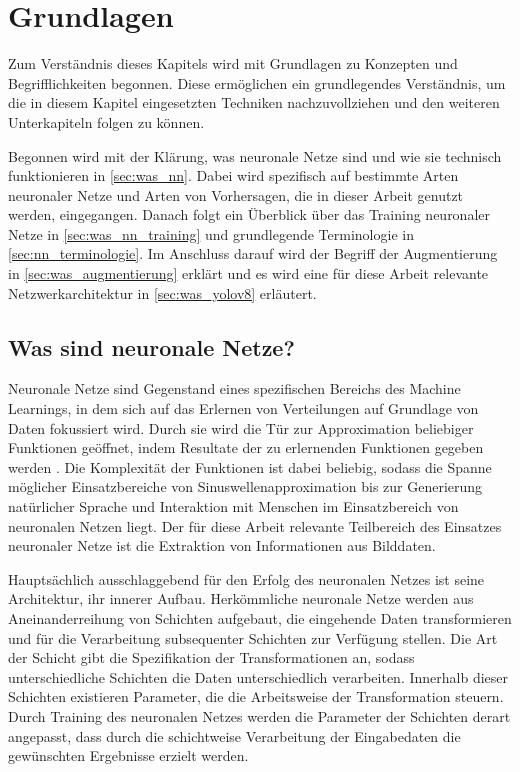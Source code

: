 
\section{Grundlagen}
\label{sec:ki:grundlagen}

Zum Verständnis dieses Kapitels wird mit Grundlagen zu Konzepten und Begrifflichkeiten begonnen. Diese ermöglichen ein grundlegendes Verständnis, um die in diesem Kapitel eingesetzten Techniken nachzuvollziehen und den weiteren Unterkapiteln folgen zu können.

Begonnen wird mit der Klärung, was neuronale Netze sind und wie sie technisch funktionieren in \autoref{sec:was_nn}. Dabei wird spezifisch auf bestimmte Arten neuronaler Netze und Arten von Vorhersagen, die in dieser Arbeit genutzt werden, eingegangen. Danach folgt ein Überblick über das Training neuronaler Netze in \autoref{sec:was_nn_training} und grundlegende Terminologie in \autoref{sec:nn_terminologie}. Im Anschluss darauf wird der Begriff der Augmentierung in \autoref{sec:was_augmentierung} erklärt und es wird eine für diese Arbeit relevante Netzwerkarchitektur in \autoref{sec:was_yolov8} erläutert.


\subsection{Was sind neuronale Netze?}
\label{sec:was_nn}

Neuronale Netze sind Gegenstand eines spezifischen Bereichs des Machine Learnings, in dem sich auf das Erlernen von Verteilungen auf Grundlage von Daten fokussiert wird. Durch sie wird die Tür zur Approximation beliebiger Funktionen geöffnet, indem Resultate der zu erlernenden Funktionen gegeben werden \cite{cv_general}. Die Komplexität der Funktionen ist dabei beliebig, sodass die Spanne möglicher Einsatzbereiche von Sinuswellenapproximation bis zur Generierung natürlicher Sprache und Interaktion mit Menschen im Einsatzbereich von neuronalen Netzen liegt. Der für diese Arbeit relevante Teilbereich des Einsatzes neuronaler Netze ist die Extraktion von Informationen aus Bilddaten.

Hauptsächlich ausschlaggebend für den Erfolg des neuronalen Netzes ist seine Architektur, ihr innerer Aufbau. Herkömmliche neuronale Netze werden aus Aneinanderreihung von Schichten aufgebaut, die eingehende Daten transformieren und für die Verarbeitung subsequenter Schichten zur Verfügung stellen. Die Art der Schicht gibt die Spezifikation der Transformationen an, sodass unterschiedliche Schichten die Daten unterschiedlich verarbeiten. Innerhalb dieser Schichten existieren Parameter, die die Arbeitsweise der Transformation steuern. Durch Training des neuronalen Netzes werden die Parameter der Schichten derart angepasst, dass durch die schichtweise Verarbeitung der Eingabedaten die gewünschten Ergebnisse erzielt werden.


